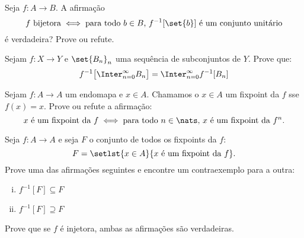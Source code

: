 \begin{exercise}
Seja $f: A \to B$. A afirmação
$$
    f \text{ bijetora} \iff \text{para todo } b \in B \text{, } f^{-1}[\set {b}] \text{ é um conjunto unitário}
$$
é verdadeira? Prove ou refute.
\end{exercise}

\begin{exercise}
Sejam $f:X \to Y$ e $\set{B_n}_n$ uma sequência de subconjuntos de $Y$. Prove que:
$$
    f^{-1}\big[\Inter^\infty_{n=0} B_n \big] = \Inter^\infty_{n=0} f^{-1}[B_n] 
$$
\end{exercise}

\begin{exercise}
Sejam $f:A \to A$ um endomapa e $x \in A$. Chamamos o $x \in A$ um fixpoint da $f$ sse $f(x) = x$. Prove ou refute a afirmação:
$$
    x \text{ é um fixpoint da } f \iff \text{para todo } n \in \nats \text{, } x \text{ é um fixpoint da } f^n.
$$
\end{exercise}

\begin{exercise}
Seja $f:A \to A$ e seja $F$ o conjunto de todos os fixpoints da $f$:
$$
    F = \setlst{x \in A}{x \text{ é um fixpoint da } f}. 
$$
Prove uma das afirmações seguintes e encontre um contraexemplo para a outra:
\begin{enumerate}[(i)]
    \item $f^{-1}[F] \subseteq F$
    \item $f^{-1}[F] \supseteq F$
\end{enumerate}
Prove que se $f$ é injetora, ambas as afirmações são verdadeiras.
\end{exercise}
